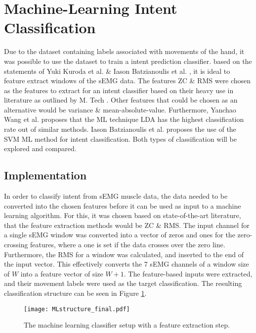 \documentclass[../main.tex]{subfiles}
\begin{document}
\section{Machine-Learning Intent Classification}
\label{sec:machine-learning}

Due to the dataset containing labels associated with movements of the hand, it was possible to use the dataset to train a intent prediction classifier.
based on the statements of Yuki Kuroda et al. \cite{Yuki2023} \& Iason Batzianoulis et al.  \cite{Batzianoulis2018}, it is ideal to feature extract windows of the \gls{sEMG} data.
The features \gls{ZC} \& \gls{RMS} were chosen as the features to extract for an intent classifier based on their heavy use in literature as outlined by M. Tech \cite{Tech2015}.
Other features that could be chosen as an alternative would be variance \& mean-absolute-value.
Furthermore, Yanchao Wang et al. \cite{YanchaoWang2022} proposes that the \gls{ML} technique \gls{LDA} has the highest classification rate out of similar methods.
Iason Batzianoulis et al. \cite{Batzianoulis2018} proposes the use of the \gls{SVM} \gls{ML} method for intent classification.
Both types of classification will be explored and compared.

\subsection{Implementation}

In order to classify intent from \gls{sEMG} muscle data, the data needed to be converted into the chosen features before it can be used as input to a machine learning algorithm.
For this, it was chosen based on state-of-the-art literature, that the feature extraction methods would be \gls{ZC} \& \gls{RMS}.
The input channel for a single \gls{sEMG} window was converted into a vector of zeros and ones for the zero-crossing features, where a one is set if the data crosses over the zero line.
Furthermore, the \gls{RMS} for a window was calculated, and inserted to the end of the input vector.
This effectively converts the 7 \gls{sEMG} channels of a window size of $W$ into a feature vector of size $W+1$.
The feature-based inputs were extracted, and their movement labels were used as the target classification.
The resulting classification structure can be seen in Figure \ref{fig:mlclassifier}.

\begin{figure}[H]
\begin{center}
\texttt{[image: MLstructure\_final.pdf]}
\caption{The machine learning classifier setup with a feature extraction step.}
\label{fig:mlclassifier}
\end{center}
\end{figure}
\end{document}

